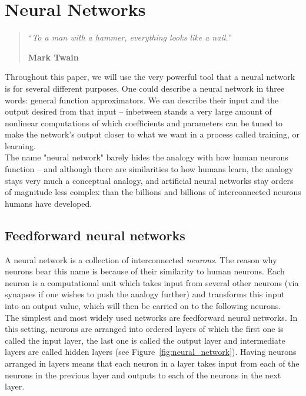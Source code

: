 \chapter{Neural Networks}
\begin{quotation}
\noindent ``\emph{To a man with a hammer, everything looks like a nail.}''
\begin{flushright}\textbf{Mark Twain}\end{flushright}
\end{quotation}
\vspace*{0.5cm}

Throughout this paper, we will use the very powerful tool that a neural network
is for several different purposes. One could describe a neural network in 
three words: general function approximators. We can describe their input
and the output desired from that input -- inbetween stands a very large amount of
nonlinear computations of which coefficients and parameters can be tuned to
make the network's output closer to what we want in a process called training, 
or learning.\\

The name "neural network"
barely hides the analogy with how human neurons function -- and although there
are similarities to how humans learn, the analogy stays very much a conceptual
analogy, and artificial neural networks stay orders of magnitude less complex
than the billions and billions of interconnected neurons humans have developed. 

\section{Feedforward neural networks}
A neural network is a collection of interconnected \textit{neurons}. The
reason why neurons bear this name is because of their similarity to 
human neurons. Each neuron is a computational unit which takes input
from several other neurons (via synapses if one wishes to push the analogy further)
and transforms this input into an output value, which will then be carried on
to the following neurons.\\

The simplest and most widely used networks are feedforward neural networks. In
this setting, neurons are arranged into ordered layers of which the first one is
called the input layer, the last one is called the output layer and
intermediate layers are called hidden layers
(see Figure~\ref{fig:neural_network}). Having neurons arranged in layers
means that each neuron in a layer takes input from each of the neurons
in the previous layer and outputs to each of the neurons in the next layer.\\

